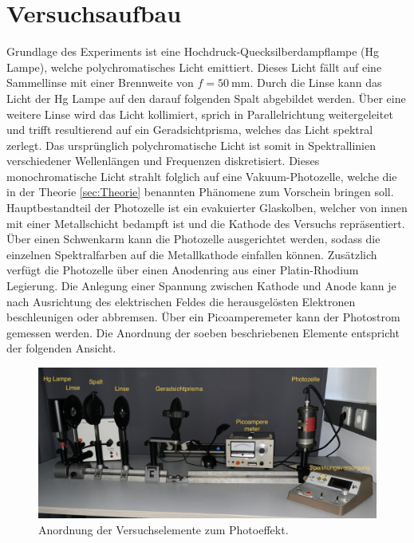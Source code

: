 %

%

\section{Versuchsaufbau}
\label{sec:Versuchsaufbau}

Grundlage des Experiments ist eine Hochdruck-Quecksilberdampflampe (Hg Lampe), welche polychromatisches Licht emittiert. Dieses Licht fällt auf eine
Sammellinse mit einer Brennweite von $f = \qty{50}{\milli\meter}$. Durch die Linse kann das Licht der Hg Lampe auf den darauf folgenden Spalt abgebildet 
werden. Über eine weitere Linse wird das Licht kollimiert, sprich in Parallelrichtung weitergeleitet und trifft resultierend auf ein Geradsichtprisma, 
welches das Licht spektral zerlegt. Das ursprünglich polychromatische Licht ist somit in Spektrallinien verschiedener Wellenlängen und Frequenzen 
diskretisiert. Dieses monochromatische Licht strahlt folglich auf eine Vakuum-Photozelle, welche die in der Theorie \ref{sec:Theorie} benannten 
Phänomene zum Vorschein bringen soll. Hauptbestandteil der Photozelle ist ein evakuierter Glaskolben, welcher von innen mit einer Metallschicht bedampft
ist und die Kathode des Versuchs repräsentiert. Über einen Schwenkarm kann die Photozelle ausgerichtet werden, sodass die einzelnen Spektralfarben auf die 
Metallkathode einfallen können. Zusätzlich verfügt die Photozelle über einen Anodenring aus einer Platin-Rhodium Legierung. Die Anlegung
einer Spannung zwischen Kathode und Anode kann je nach Ausrichtung des elektrischen Feldes die herausgelösten Elektronen beschleunigen oder abbremsen. 
Über ein Picoamperemeter kann der Photostrom gemessen werden. Die Anordnung der soeben beschriebenen Elemente entspricht der folgenden Ansicht.\\

\begin{figure}
    \centering
    \includegraphics[height=5cm]{content/Anordnung.png}
    \caption{Anordnung der Versuchselemente zum Photoeffekt\cite{Versuchsanleitung_v500}.}
    \label{fig:Anordnung}
\end{figure}


